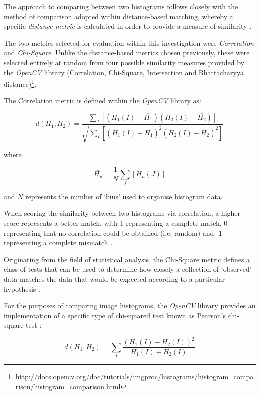 The approach to comparing between two histograms follows closely with the method of comparison adopted within distance-based matching, whereby a specific \textit{distance metric} is calculated in order to provide a measure of similarity \cite{bradski2008learning}. 

The two metrics selected for evaluation within this investigation were \textit{Correlation} and \textit{Chi-Square}. Unlike the distance-based metrics chosen previously, these were selected entirely at random from four possible similarity measures provided by the \textit{OpenCV} library (Correlation, Chi-Square, Intersection and Bhattacharyya distance)\footnote{\url{http://docs.opencv.org/doc/tutorials/imgproc/histograms/histogram_comparison/histogram_comparison.html}}.

The Correlation metric is defined within the \textit{OpenCV} library as:

\begin{equation}
d(H_{1}, H_{2}) = \frac{\sum\nolimits_{I}[(H_{1}(I) - \bar{H_{1}})(H_{2}(I) - \bar{H_{2}})]}{\sqrt{\sum\nolimits_{I}[(H_{1}(I) - \bar{H_{1}})^2(H_{2}(I) - \bar{H_{2}})^2]}}
\end{equation}

where

\begin{equation}
\bar{H_{n}} = \frac{1}{N}\sum\limits_{J}[H_{n}(J)]
\end{equation}

and $N$ represents the number of `bins' used to organise histogram data. 

When scoring the similarity between two histograms via correlation, a higher score represents a better match, with 1 representing a complete match, 0 representing that no correlation could be obtained (i.e. random) and -1 representing a complete mismatch \cite{bradski2008learning}.

Originating from the field of statistical analysis, the Chi-Square metric defines a class of tests that can be used to determine how closely a collection of `observed' data matches the data that would be expected according to a particular hypothesis \cite{mclaughlin}. 

For the purposes of comparing image histograms, the \textit{OpenCV} library provides an implementation of a specific type of chi-squared test known as Pearson's chi-square test \cite{bradski2008learning}:

\begin{equation}
d(H_{1}, H_{2}) = \sum\limits_{I}\frac{(H_{1}(I) - H_{2}(I))^2}{H_{1}(I) + H_{2}(I)}
\end{equation}

